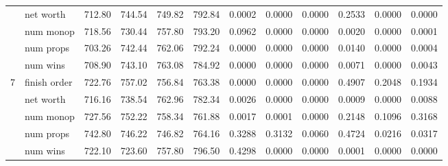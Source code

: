 \begin{landscape}
\begin{table}[ht]
\begin{tabularx}{\linewidth}{|p{1in}|p{1in}|r|r|r|r|r|r|r|r|r|r|}
\cline{2-12}             & net worth & 712.80 & 744.54 & 749.82 & \cellcolor{green!55!white}792.84 & 0.0002 & 0.0000 & 0.0000 & \cellcolor{red!55!white}0.2533 & 0.0000 & 0.0000 \\
\cline{2-12}             & num monop & 718.56 & 730.44 & \cellcolor{green!55!white}757.80 & \cellcolor{green!55!white}793.20 & \cellcolor{red!55!white}0.0962 & 0.0000 & 0.0000 & 0.0020 & 0.0000 & 0.0001 \\
\cline{2-12}             & num props & 703.26 & 742.44 & \cellcolor{green!55!white}762.06 & \cellcolor{green!55!white}792.24 & 0.0000 & 0.0000 & 0.0000 & \cellcolor{red!55!white}0.0140 & 0.0000 & 0.0004 \\
\cline{2-12}             & num wins & 708.90 & 743.10 & \cellcolor{green!55!white}763.08 & \cellcolor{green!55!white}784.92 & 0.0000 & 0.0000 & 0.0000 & 0.0071 & 0.0000 & 0.0043 \\
\cline{1-12}
      \multirow{5}{*}{7} & finish order & 722.76 & \cellcolor{green!55!white}757.02 & \cellcolor{green!55!white}756.84 & \cellcolor{green!55!white}763.38 & 0.0000 & 0.0000 & 0.0000 & \cellcolor{red!55!white}0.4907 & \cellcolor{red!55!white}0.2048 & \cellcolor{red!55!white}0.1934 \\
\cline{2-12}             & net worth & 716.16 & 738.54 & \cellcolor{green!55!white}762.96 & \cellcolor{green!55!white}782.34 & 0.0026 & 0.0000 & 0.0000 & 0.0009 & 0.0000 & 0.0088 \\
\cline{2-12}             & num monop & 727.56 & \cellcolor{green!55!white}752.22 & \cellcolor{green!55!white}758.34 & \cellcolor{green!55!white}761.88 & 0.0017 & 0.0001 & 0.0000 & \cellcolor{red!55!white}0.2148 & \cellcolor{red!55!white}0.1096 & \cellcolor{red!55!white}0.3168 \\
\cline{2-12}             & num props & 742.80 & 746.22 & 746.82 & \cellcolor{green!55!white}764.16 & \cellcolor{red!55!white}0.3288 & \cellcolor{red!55!white}0.3132 & 0.0060 & \cellcolor{red!55!white}0.4724 & \cellcolor{red!55!white}0.0216 & \cellcolor{red!55!white}0.0317 \\
\cline{2-12}             & num wins & 722.10 & 723.60 & \cellcolor{green!55!white}757.80 & \cellcolor{green!55!white}796.50 & \cellcolor{red!55!white}0.4298 & 0.0000 & 0.0000 & 0.0001 & 0.0000 & 0.0000 \\
\cline{1-12}
    \end{tabularx}%
  \label{tab:intrapop1024_numwins}%
\end{table}%



\end{landscape}
